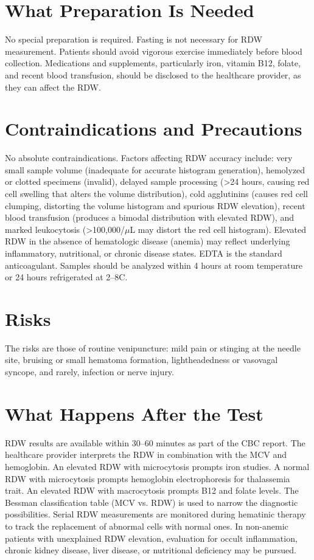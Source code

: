 \section*{What Preparation Is Needed}
No special preparation is required. Fasting is not necessary for RDW measurement. Patients should avoid vigorous exercise immediately before blood collection. Medications and supplements, particularly iron, vitamin B12, folate, and recent blood transfusion, should be disclosed to the healthcare provider, as they can affect the RDW.

\section*{Contraindications and Precautions}
No absolute contraindications. Factors affecting RDW accuracy include: very small sample volume (inadequate for accurate histogram generation), hemolyzed or clotted specimens (invalid), delayed sample processing (>24 hours, causing red cell swelling that alters the volume distribution), cold agglutinins (causes red cell clumping, distorting the volume histogram and spurious RDW elevation), recent blood transfusion (produces a bimodal distribution with elevated RDW), and marked leukocytosis (>100,000/$\mu$L may distort the red cell histogram). Elevated RDW in the absence of hematologic disease (anemia) may reflect underlying inflammatory, nutritional, or chronic disease states. EDTA is the standard anticoagulant. Samples should be analyzed within 4 hours at room temperature or 24 hours refrigerated at 2--8\textdegree{}C.

\section*{Risks}
The risks are those of routine venipuncture: mild pain or stinging at the needle site, bruising or small hematoma formation, lightheadedness or vasovagal syncope, and rarely, infection or nerve injury.

\section*{What Happens After the Test}
RDW results are available within 30--60 minutes as part of the CBC report. The healthcare provider interprets the RDW in combination with the MCV and hemoglobin. An elevated RDW with microcytosis prompts iron studies. A normal RDW with microcytosis prompts hemoglobin electrophoresis for thalassemia trait. An elevated RDW with macrocytosis prompts B12 and folate levels. The Bessman classification table (MCV vs. RDW) is used to narrow the diagnostic possibilities. Serial RDW measurements are monitored during hematinic therapy to track the replacement of abnormal cells with normal ones. In non-anemic patients with unexplained RDW elevation, evaluation for occult inflammation, chronic kidney disease, liver disease, or nutritional deficiency may be pursued.

